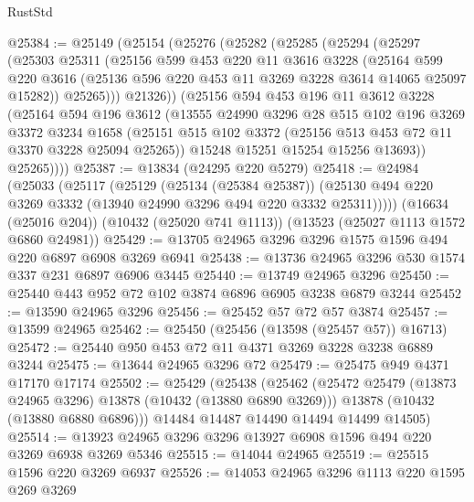 \begin{lexlean}{RustStd}
\begin{coremodule}
@25384 := @25149
    (@25154
      (@25276
        (@25282
          (@25285
            (@25294
              (@25297
                (@25303
                  @25311
                  (@25156
                    @599
                    @453
                    @220
                    @11
                    @3616
                    @3228
                    (@25164
                      @599
                      @220
                      @3616
                      (@25136 @596 @220 @453 @11 @3269 @3228 @3614 @14065 @25097 @15282))
                    @25265)))
              @21326))
          (@25156
            @594
            @453
            @196
            @11
            @3612
            @3228
            (@25164
              @594
              @196
              @3612
              (@13555
                @24990
                @3296
                @28
                @515
                @102
                @196
                @3269
                @3372
                @3234
                @1658
                (@25151 @515 @102 @3372 (@25156 @513 @453 @72 @11 @3370 @3228 @25094 @25265))
                @15248
                @15251
                @15254
                @15256
                @13693))
            @25265))))
@25387 := @13834 (@24295 @220 @5279)
@25418 := @24984
    (@25033
      (@25117
        (@25129
          (@25134 (@25384 @25387))
          (@25130 @494 @220 @3269 @3332 (@13940 @24990 @3296 @494 @220 @3332 @25311)))))
    (@16634 (@25016 @204))
    (@10432 (@25020 @741 @1113))
    (@13523 (@25027 @1113 @1572 @6860 @24981))
@25429 := @13705 @24965 @3296 @3296 @1575 @1596 @494 @220 @6897 @6908 @3269 @6941
@25438 := @13736 @24965 @3296 @530 @1574 @337 @231 @6897 @6906 @3445
@25440 := @13749 @24965 @3296
@25450 := @25440 @443 @952 @72 @102 @3874 @6896 @6905 @3238 @6879 @3244
@25452 := @13590 @24965 @3296
@25456 := @25452 @57 @72 @57 @3874
@25457 := @13599 @24965
@25462 := @25450 (@25456 (@13598 (@25457 @57)) @16713)
@25472 := @25440 @950 @453 @72 @11 @4371 @3269 @3228 @3238 @6889 @3244
@25475 := @13644 @24965 @3296 @72
@25479 := @25475 @949 @4371 @17170 @17174
@25502 := @25429
    (@25438
      (@25462
        (@25472 @25479 (@13873 @24965 @3296) @13878 (@10432 (@13880 @6890 @3269)))
        @13878
        (@10432 (@13880 @6880 @6896)))
      @14484
      @14487
      @14490
      @14494
      @14499
      @14505)
@25514 := @13923 @24965 @3296 @3296 @13927 @6908 @1596 @494 @220 @3269 @6938 @3269 @5346
@25515 := @14044 @24965
@25519 := @25515 @1596 @220 @3269 @6937
@25526 := @14053 @24965 @3296 @1113 @220 @1595 @269 @3269

\end{coremodule}
\end{lexlean}
